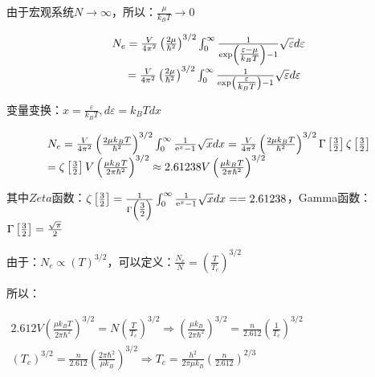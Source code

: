 由于宏观系统$N \to \infty $，所以：$\frac{\mu }{{k_B T}} \to 0$

\begin{equation}\label{31-1-3}
\begin{array}{c}
N_e  = \frac{V}{{4\pi ^2 }}\left( {\frac{{2\mu }}{{\hbar ^2 }}} \right)^{3/2} \int_0^\infty  {\frac{1}{{\exp \left( {{\textstyle{{\varepsilon  - \mu } \over {k_B T}}}} \right) - 1}}\sqrt \varepsilon  d\varepsilon }  \\
\quad = \frac{V}{{4\pi ^2 }}\left( {\frac{{2\mu }}{{\hbar ^2 }}} \right)^{3/2} \int_0^\infty  {\frac{1}{{\exp \left( {{\textstyle{\varepsilon  \over {k_B T}}}} \right) - 1}}\sqrt \varepsilon  d\varepsilon }
\end{array}
\end{equation}

变量变换：$x = \frac{\varepsilon }{{k_B T}}, d\varepsilon  = k_B Tdx$

\begin{equation}\label{31-1-4}
\begin{array}{l}
 N_e  = \frac{V}{{4\pi ^2 }}\left( {\frac{{2\mu k_B T}}{{\hbar ^2 }}} \right)^{3/2} \int_0^\infty  {\frac{1}{{{\mathop{\rm e}\nolimits} ^x  - 1}}\sqrt x dx}  = \frac{V}{{4\pi ^2 }}\left( {\frac{{2\mu k_B T}}{{\hbar ^2 }}} \right)^{3/2} \Gamma \left[ {{\textstyle{3 \over 2}}} \right]\zeta \left[ {{\textstyle{3 \over 2}}} \right] \\
  = \zeta \left[ {{\textstyle{3 \over 2}}} \right]V\left( {\frac{{\mu k_B T}}{{2\pi \hbar ^2 }}} \right)^{3/2}  \approx 2.61238V\left( {\frac{{\mu k_B T}}{{2\pi \hbar ^2 }}} \right)^{3/2}  \\
 \end{array}
\end{equation}

其中$Zeta$函数：$\zeta \left[ {{\textstyle{3 \over 2}}} \right] =
\frac{1}{{\Gamma \left( {{\textstyle{3 \over 2}}}
\right)}}\int_0^\infty  {\frac{1}{{{\mathop{\rm e}\nolimits} ^x  -
1}}\sqrt x dx}  =  = 2.61238$，Gamma函数：$\Gamma \left[
{{\textstyle{3 \over 2}}} \right] = \frac{{\sqrt \pi  }}{2}$


由于：$N_e  \propto \left( T \right)^{3/2} $，可以定义：$\frac{{N_e }}{N} = \left( {\frac{T}{{T_c }}} \right)^{3/2} $

所以：

\begin{center}
$\begin{array}{l}
 2.612V\left( {\frac{{\mu k_B T}}{{2\pi \hbar ^2 }}} \right)^{3/2}  = N\left( {\frac{T}{{T_c }}} \right)^{3/2}  \Rightarrow \left( {\frac{{\mu k_B }}{{2\pi \hbar ^2 }}} \right)^{3/2}  = \frac{n}{{2.612}}\left( {\frac{1}{{T_c }}} \right)^{3/2}  \\
 \left( {T_c } \right)^{3/2}  = \frac{n}{{2.612}}\left( {\frac{{2\pi \hbar ^2 }}{{\mu k_B }}} \right)^{3/2}  \Rightarrow T_c  = \frac{{h^2 }}{{2\pi \mu k_B }}\left( {\frac{n}{{2.612}}} \right)^{2/3}  \\
 \end{array}$
\end{center}

